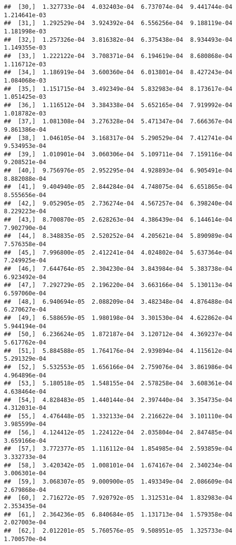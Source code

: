 \documentclass[
]{article}
\begin{document}
\begin{verbatim}
##  [30,]  1.327733e-04  4.032403e-04  6.737074e-04  9.441744e-04  1.214641e-03
##  [31,]  1.292529e-04  3.924392e-04  6.556256e-04  9.188119e-04  1.181998e-03
##  [32,]  1.257326e-04  3.816382e-04  6.375438e-04  8.934493e-04  1.149355e-03
##  [33,]  1.222122e-04  3.708371e-04  6.194619e-04  8.680868e-04  1.116712e-03
##  [34,]  1.186919e-04  3.600360e-04  6.013801e-04  8.427243e-04  1.084068e-03
##  [35,]  1.151715e-04  3.492349e-04  5.832983e-04  8.173617e-04  1.051425e-03
##  [36,]  1.116512e-04  3.384338e-04  5.652165e-04  7.919992e-04  1.018782e-03
##  [37,]  1.081308e-04  3.276328e-04  5.471347e-04  7.666367e-04  9.861386e-04
##  [38,]  1.046105e-04  3.168317e-04  5.290529e-04  7.412741e-04  9.534953e-04
##  [39,]  1.010901e-04  3.060306e-04  5.109711e-04  7.159116e-04  9.208521e-04
##  [40,]  9.756976e-05  2.952295e-04  4.928893e-04  6.905491e-04  8.882088e-04
##  [41,]  9.404940e-05  2.844284e-04  4.748075e-04  6.651865e-04  8.555656e-04
##  [42,]  9.052905e-05  2.736274e-04  4.567257e-04  6.398240e-04  8.229223e-04
##  [43,]  8.700870e-05  2.628263e-04  4.386439e-04  6.144614e-04  7.902790e-04
##  [44,]  8.348835e-05  2.520252e-04  4.205621e-04  5.890989e-04  7.576358e-04
##  [45,]  7.996800e-05  2.412241e-04  4.024802e-04  5.637364e-04  7.249925e-04
##  [46,]  7.644764e-05  2.304230e-04  3.843984e-04  5.383738e-04  6.923492e-04
##  [47,]  7.292729e-05  2.196220e-04  3.663166e-04  5.130113e-04  6.597060e-04
##  [48,]  6.940694e-05  2.088209e-04  3.482348e-04  4.876488e-04  6.270627e-04
##  [49,]  6.588659e-05  1.980198e-04  3.301530e-04  4.622862e-04  5.944194e-04
##  [50,]  6.236624e-05  1.872187e-04  3.120712e-04  4.369237e-04  5.617762e-04
##  [51,]  5.884588e-05  1.764176e-04  2.939894e-04  4.115612e-04  5.291329e-04
##  [52,]  5.532553e-05  1.656166e-04  2.759076e-04  3.861986e-04  4.964896e-04
##  [53,]  5.180518e-05  1.548155e-04  2.578258e-04  3.608361e-04  4.638464e-04
##  [54,]  4.828483e-05  1.440144e-04  2.397440e-04  3.354735e-04  4.312031e-04
##  [55,]  4.476448e-05  1.332133e-04  2.216622e-04  3.101110e-04  3.985599e-04
##  [56,]  4.124412e-05  1.224122e-04  2.035804e-04  2.847485e-04  3.659166e-04
##  [57,]  3.772377e-05  1.116112e-04  1.854985e-04  2.593859e-04  3.332733e-04
##  [58,]  3.420342e-05  1.008101e-04  1.674167e-04  2.340234e-04  3.006301e-04
##  [59,]  3.068307e-05  9.000900e-05  1.493349e-04  2.086609e-04  2.679868e-04
##  [60,]  2.716272e-05  7.920792e-05  1.312531e-04  1.832983e-04  2.353435e-04
##  [61,]  2.364236e-05  6.840684e-05  1.131713e-04  1.579358e-04  2.027003e-04
##  [62,]  2.012201e-05  5.760576e-05  9.508951e-05  1.325733e-04  1.700570e-04

\end{verbatim}
\end{document}
